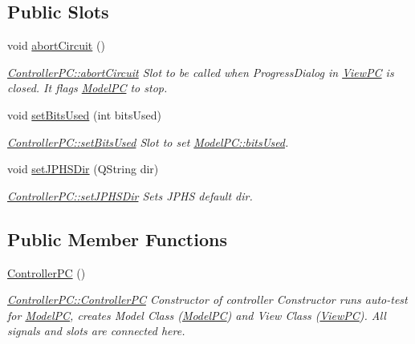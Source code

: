 \subsection*{Public Slots}
\begin{DoxyCompactItemize}
\item 
void \mbox{\hyperlink{class_controller_p_c_a8814989f7be1214e06b2e720889066b0}{abort\+Circuit}} ()
\begin{DoxyCompactList}\small\item\em \mbox{\hyperlink{class_controller_p_c_a8814989f7be1214e06b2e720889066b0}{Controller\+P\+C\+::abort\+Circuit}} Slot to be called when Progress\+Dialog in \mbox{\hyperlink{class_view_p_c}{View\+PC}} is closed. It flags \mbox{\hyperlink{class_model_p_c}{Model\+PC}} to stop. \end{DoxyCompactList}\item 
void \mbox{\hyperlink{class_controller_p_c_afd8d33ed84e463c5e0ce6715067003f3}{set\+Bits\+Used}} (int bits\+Used)
\begin{DoxyCompactList}\small\item\em \mbox{\hyperlink{class_controller_p_c_afd8d33ed84e463c5e0ce6715067003f3}{Controller\+P\+C\+::set\+Bits\+Used}} Slot to set \mbox{\hyperlink{class_model_p_c_a655deb6a8afa94c7f4aadb3056989038}{Model\+P\+C\+::bits\+Used}}. \end{DoxyCompactList}\item 
void \mbox{\hyperlink{class_controller_p_c_ac00d29685a7e5b780c01eb438e10f96d}{set\+J\+P\+H\+S\+Dir}} (Q\+String dir)
\begin{DoxyCompactList}\small\item\em \mbox{\hyperlink{class_controller_p_c_ac00d29685a7e5b780c01eb438e10f96d}{Controller\+P\+C\+::set\+J\+P\+H\+S\+Dir}} Sets J\+P\+HS default dir. \end{DoxyCompactList}\end{DoxyCompactItemize}
\subsection*{Public Member Functions}
\begin{DoxyCompactItemize}
\item 
\mbox{\hyperlink{class_controller_p_c_afa6c92d67bf3b6531c42385fc5938003}{Controller\+PC}} ()
\begin{DoxyCompactList}\small\item\em \mbox{\hyperlink{class_controller_p_c_afa6c92d67bf3b6531c42385fc5938003}{Controller\+P\+C\+::\+Controller\+PC}} Constructor of controller Constructor runs auto-\/test for \mbox{\hyperlink{class_model_p_c}{Model\+PC}}, creates Model Class (\mbox{\hyperlink{class_model_p_c}{Model\+PC}}) and View Class (\mbox{\hyperlink{class_view_p_c}{View\+PC}}). All signals and slots are connected here. \end{DoxyCompactList}\end{DoxyCompactItemize}
